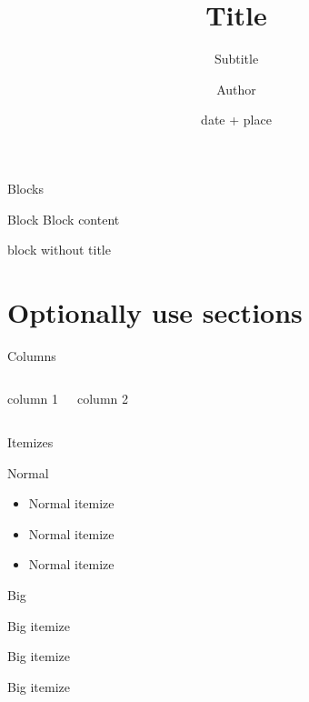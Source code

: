 \documentclass[aspectratio=169,12pt]{beamer}
\title{Title}
\subtitle{Subtitle}
\author{Author}
\date{date + place}
\begin{document}



\begin{frame}{Blocks}

\begin{block}{Block}
Block content
\end{block}



\begin{block}{}
block without title
\end{block}



\end{frame}

\section{Optionally use sections}
\begin{frame}{Columns}

\begin{columns}

column 1

column 2

\end{columns}


\end{frame}


\begin{frame}{Itemizes}

\begin{block}{Normal}
    \begin{itemize}
        \item Normal itemize
        \item Normal itemize
        \item Normal itemize
    \end{itemize}
\end{block}



\begin{block}{Big}
    \begin{itemizebig}
        \item Big itemize
        \item Big itemize
        \item Big itemize
    \end{itemizebig}
\end{block}


\end{frame}



\end{document}

